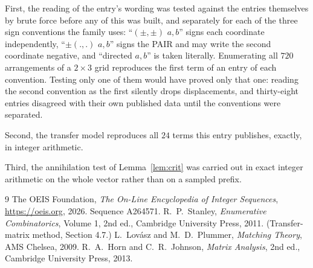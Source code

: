 \documentclass[11pt,a4paper]{article}
\theoremstyle{plain}
\theoremstyle{definition}
\begin{document}
First, the reading of the entry's wording was tested against the entries themselves by brute
force before any of this was built, and separately for each of the three sign conventions the
family uses: ``$(\pm,\pm)$ $a,b$'' signs each coordinate independently, ``$\pm(.,.)$ $a,b$''
signs the PAIR and may write the second coordinate negative, and ``directed $a,b$'' is taken
literally. Enumerating all $720$ arrangements of a $2\times3$ grid reproduces the first term
of an entry of each convention. Testing only one of them would have proved only that one:
reading the second convention as the first silently drops displacements, and thirty-eight
entries disagreed with their own published data until the conventions were separated.

Second, the transfer model reproduces all $24$ terms this entry publishes, exactly, in
integer arithmetic.

Third, the annihilation test of Lemma~\ref{lem:crit} was carried out in exact integer
arithmetic on the whole vector rather than on a sampled prefix.

\begin{thebibliography}{9}
 The OEIS Foundation, \emph{The On-Line Encyclopedia of Integer
Sequences}, \url{https://oeis.org}, 2026. Sequence A264571.
 R.~P.~Stanley, \emph{Enumerative Combinatorics}, Volume 1, 2nd ed.,
Cambridge University Press, 2011. (Transfer-matrix method, Section 4.7.)
 L.~Lov\'asz and M.~D.~Plummer, \emph{Matching Theory}, AMS Chelsea, 2009.
 R.~A.~Horn and C.~R.~Johnson, \emph{Matrix Analysis}, 2nd ed., Cambridge
University Press, 2013.
\end{thebibliography}
\end{document}
